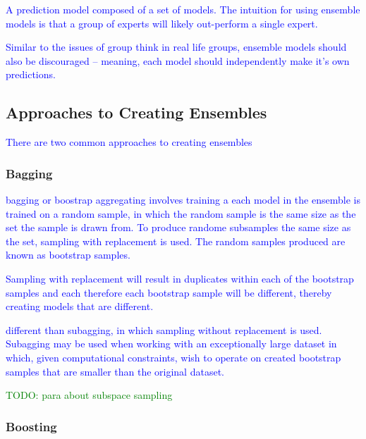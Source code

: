 \textcolor{blue}{A prediction model composed of a set of models. The intuition for using ensemble models is that a group of experts will likely out-perform a single expert.}

\textcolor{blue}{Similar to the issues of group think in real life groups, ensemble models should also be discouraged -- meaning, each model should independently make it's own predictions.}


\subsection{Approaches to Creating Ensembles}

\textcolor{blue}{There are two common approaches to creating ensembles}

\subsubsection{Bagging}

\textcolor{blue}{{bagging} or {boostrap aggregating} involves training a each model in the ensemble is trained on a random sample, in which the random sample is the same size as the set the sample is drawn from. To produce randome subsamples the same size as the set, {sampling with replacement} is used. The random samples produced are known as {bootstrap samples}.}

\textcolor{blue}{Sampling with replacement will result in duplicates within each of the bootstrap samples and each therefore each bootstrap sample will be different, thereby creating models that are different.}

\textcolor{blue}{different than subagging, in which {sampling without replacement} is used. Subagging may be used when working with an exceptionally large dataset in which, given computational constraints, wish to operate on created bootstrap samples that are smaller than the original dataset.}

\textcolor{green}{TODO: para about {subspace sampling}}

\subsubsection{Boosting}

